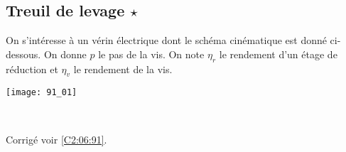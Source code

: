 \normaltrue \difficilefalse \tdifficilefalse
\correctionfalse


\subsection*{Treuil de levage $\star$ \label{C2:06:91}}
\setcounter{question}{0}

\ifcorrection
\else
{}
\fi

\ifprof
\else
On s’intéresse à un vérin électrique dont le schéma cinématique est donné ci-dessous. On donne $p$ le pas de la vis. On note $\eta_r$ le rendement d'un étage de réduction et $\eta_v$ le rendement de la vis.
\begin{center}
\texttt{[image: 91\_01]}
\end{center}


\fi


\ifprof
\else
\fi

\ifprof ~\\

\else
\fi


\ifprof
\else
\begin{flushright}
\footnotesize{Corrigé  voir \ref{C2:06:91}.}
\end{flushright}%
\fi